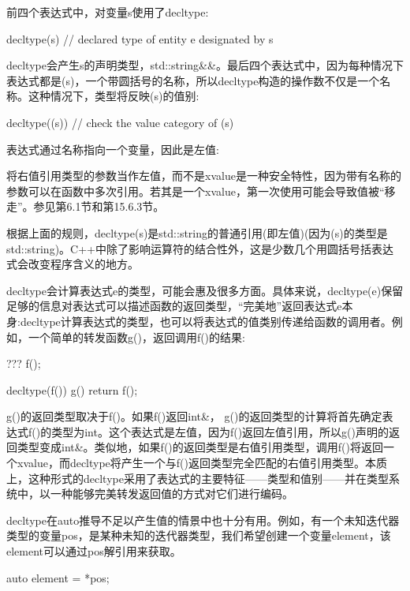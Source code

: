 前四个表达式中，对变量s使用了decltype:

\begin{cpp}
decltype(s) // declared type of entity e designated by s
\end{cpp}

decltype会产生s的声明类型，std::string\&\&。最后四个表达式中，因为每种情况下表达式都是(s)，一个带圆括号的名称，所以decltype构造的操作数不仅是一个名称。这种情况下，类型将反映(s)的值别:

\begin{cpp}
decltype((s)) // check the value category of (s)
\end{cpp}

表达式通过名称指向一个变量，因此是左值:

\begin{notice}将右值引用类型的参数当作左值，而不是xvalue是一种安全特性，因为带有名称的参数可以在函数中多次引用。若其是一个xvalue，第一次使用可能会导致值被“移走”。参见第6.1节和第15.6.3节。
\end{notice}

根据上面的规则，decltype(s)是std::string的普通引用(即左值)(因为(s)的类型是std::string)。C++中除了影响运算符的结合性外，这是少数几个用圆括号括表达式会改变程序含义的地方。

decltype会计算表达式e的类型，可能会惠及很多方面。具体来说，decltype(e)保留足够的信息对表达式可以描述函数的返回类型，“完美地”返回表达式e本身:decltype计算表达式的类型，也可以将表达式的值类别传递给函数的调用者。例如，一个简单的转发函数g()，返回调用f()的结果:

\begin{cpp}
??? f();

decltype(f()) g()
{
	return f();
}
\end{cpp}

g()的返回类型取决于f()。如果f()返回int\&， g()的返回类型的计算将首先确定表达式f()的类型为int。这个表达式是左值，因为f()返回左值引用，所以g()声明的返回类型变成int\&。类似地，如果f()的返回类型是右值引用类型，调用f()将返回一个xvalue，而decltype将产生一个与f()返回类型完全匹配的右值引用类型。本质上，这种形式的decltype采用了表达式的主要特征——类型和值别——并在类型系统中，以一种能够完美转发返回值的方式对它们进行编码。

decltype在auto推导不足以产生值的情景中也十分有用。例如，有一个未知迭代器类型的变量pos，是某种未知的迭代器类型，我们希望创建一个变量element，该element可以通过pos解引用来获取。

\begin{cpp}
auto element = *pos;
\end{cpp}

